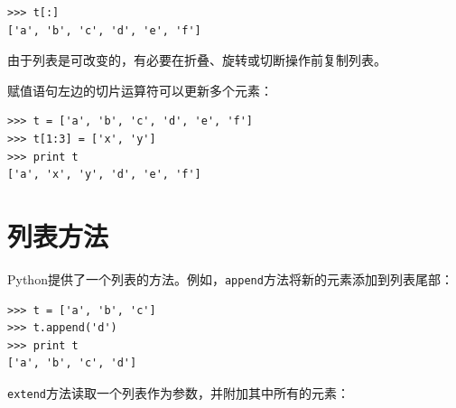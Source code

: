 
\beforeverb
\begin{verbatim}
>>> t[:]
['a', 'b', 'c', 'd', 'e', 'f']
\end{verbatim}
\afterverb
%
由于列表是可改变的，有必要在折叠、旋转或切断操作前复制列表。


赋值语句左边的切片运算符可以更新多个元素：


\beforeverb
\begin{verbatim}
>>> t = ['a', 'b', 'c', 'd', 'e', 'f']
>>> t[1:3] = ['x', 'y']
>>> print t
['a', 'x', 'y', 'd', 'e', 'f']
\end{verbatim}
\afterverb
%


%

%


\section{列表方法}


Python提供了一个列表的方法。例如，{\tt append}方法将新的元素添加到列表尾部：


\beforeverb
\begin{verbatim}
>>> t = ['a', 'b', 'c']
>>> t.append('d')
>>> print t
['a', 'b', 'c', 'd']
\end{verbatim}
\afterverb
%
{\tt extend}方法读取一个列表作为参数，并附加其中所有的元素：


